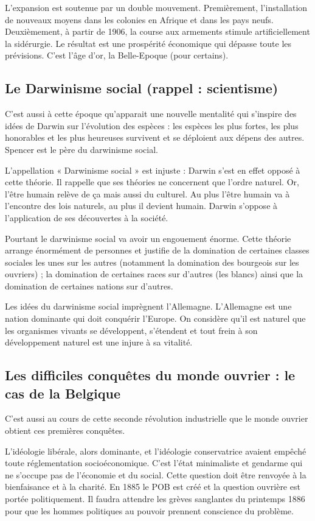 \documentclass[12pt]{report}
\begin{document}
L’expansion est soutenue par un double mouvement. Premièrement, l’installation de nouveaux moyens dans les colonies en Afrique et dans les pays neufs. Deuxièmement, à partir de 1906, la course aux armements stimule artificiellement la sidérurgie.
Le résultat est une prospérité économique qui dépasse toute les prévisions. C’est l’âge d’or, la
Belle-Epoque (pour certains).

\subsection{Le Darwinisme social (rappel : scientisme)}

C’est aussi à cette époque qu’apparait une nouvelle mentalité qui s’inspire des idées de
Darwin sur l’évolution des espèces : les espèces les plus fortes, les plus honorables et les plus
heureuses survivent et se déploient aux dépens des autres. Spencer est le père du darwinisme
social.

L’appellation « Darwinisme social » est injuste : Darwin s’est en effet opposé à cette théorie.
Il rappelle que ses théories ne concernent que l’ordre naturel. Or, l’être humain relève de ça
mais aussi du culturel. Au plus l’être humain va à l’encontre des lois naturels, au plus il
devient humain. Darwin s’oppose à l’application de ses découvertes à la société.

Pourtant le darwinisme social va avoir un engouement énorme. Cette théorie arrange
énormément de personnes et justifie de la domination de certaines classes sociales les unes sur
les autres (notamment la domination des bourgeois sur les ouvriers) ; la domination de
certaines races sur d’autres (les blancs) ainsi que la domination de certaines nations sur
d’autres.

Les idées du darwinisme social imprègnent l’Allemagne. L’Allemagne est une nation
dominante qui doit conquérir l’Europe. On considère qu’il est naturel que les organismes
vivants se développent, s’étendent et tout frein à son développement naturel est une injure à sa
vitalité.

\subsection{Les difficiles conquêtes du monde ouvrier : le cas de la Belgique}

C’est aussi au cours de cette seconde révolution industrielle que le monde ouvrier obtient ces
premières conquêtes.

L’idéologie libérale, alors dominante, et l’idéologie conservatrice avaient empêché toute
réglementation socioéconomique. C’est l’état minimaliste et gendarme qui ne s’occupe pas de
l’économie et du social. Cette question doit être renvoyée à la bienfaisance et à la charité. En
1885 le POB est créé et la question ouvrière est portée politiquement. Il faudra attendre les
grèves sanglantes du printemps 1886 pour que les hommes politiques au pouvoir prennent
conscience du problème.
\end{document}
